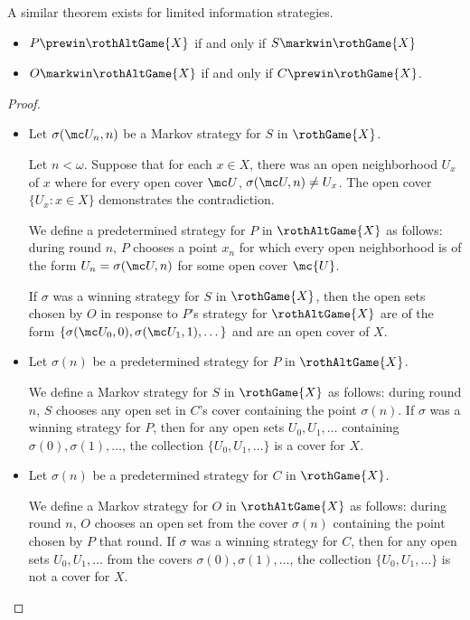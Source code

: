   A similar theorem exists for limited information strategies.

  \begin{thm}
    \begin{itemize}
      \item $P\prewin\rothAltGame{X}$ if and only if $S\markwin\rothGame{X}$
      \item $O\markwin\rothAltGame{X}$ if and only if $C\prewin\rothGame{X}$.
    \end{itemize}
  \end{thm}

  \begin{proof}

    \begin{itemize}
      \item
      Let $\sigma(\mc U_n,n)$ be a Markov strategy for $S$ in $\rothGame{X}$.

      Let $n<\omega$. Suppose that for each $x\in X$, there was an open neighborhood $U_x$ of $x$ where for every open cover $\mc U$, $\sigma(\mc U,n)\not=U_x$. The open cover $\{U_x : x\in X\}$ demonstrates the contradiction.

      We define a predetermined strategy for $P$ in $\rothAltGame{X}$ as follows: during round $n$, $P$ chooses a point $x_n$ for which every open neighborhood is of the form $U_n = \sigma(\mc U,n)$ for some open cover $\mc{U}$.

      If $\sigma$ was a winning strategy for $S$ in $\rothGame{X}$, then the open sets chosen by $O$ in response to $P$'s strategy for $\rothAltGame{X}$ are of the form $\{\sigma(\mc U_0,0),\sigma(\mc U_1,1),\dots\}$ and are an open cover of $X$.

      \item
      Let $\sigma(n)$ be a predetermined strategy for $P$ in $\rothAltGame{X}$.

      We define a Markov strategy for $S$ in $\rothGame{X}$ as follows: during round $n$, $S$ chooses any open set in $C$'s cover containing the point $\sigma(n)$. If $\sigma$ was a winning strategy for $P$, then for any open sets $U_0,U_1,\dots$ containing $\sigma(0),\sigma(1),\dots$, the collection $\{U_0,U_1,\dots\}$ is a cover for $X$.

      \item
      Let $\sigma(n)$ be a predetermined strategy for $C$ in $\rothGame{X}$.

      We define a Markov strategy for $O$ in $\rothAltGame{X}$ as follows: during round $n$, $O$ chooses an open set from the cover $\sigma(n)$ containing the point chosen by $P$ that round. If $\sigma$ was a winning strategy for $C$, then for any open sets $U_0,U_1,\dots$ from the covers $\sigma(0),\sigma(1),\dots$, the collection $\{U_0,U_1,\dots\}$ is not a cover for $X$.


\end{itemize}
\end{proof}
